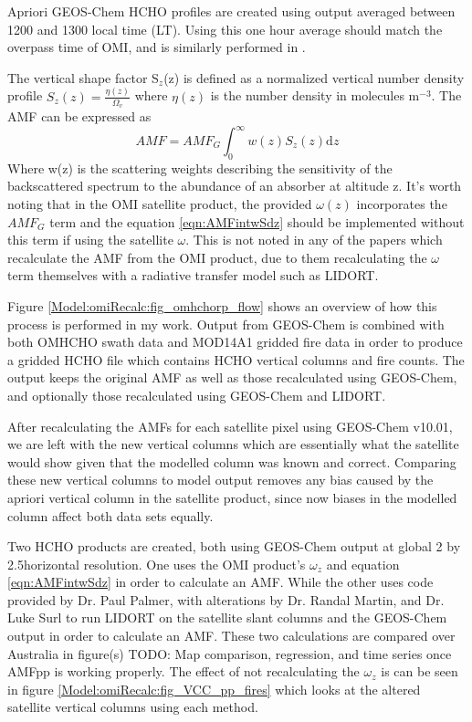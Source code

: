     
  
  
  Apriori GEOS-Chem HCHO profiles are created using output averaged between 1200 and 1300 local time (LT).
  Using this one hour average should match the overpass time of OMI, and is similarly performed in \cite{Jin2017}.
  
  
  The vertical shape factor S$_z$(z) is defined as a normalized vertical number density profile $S_z(z) = \frac{\eta(z)}{\Omega_v}$ where $\eta(z)$ is the number density in molecules m$^{-3}$. 
  The AMF can be expressed as
  \begin{equation} 
    \label{eqn:AMFintwSdz}
    AMF = AMF_G \int_0^\infty w(z) S_z(z) \mathrm{d}z
  \end{equation}
  Where w(z) is the scattering weights describing the sensitivity of the backscattered spectrum to the abundance of an absorber at altitude z.
  It's worth noting that in the OMI satellite product, the provided $\omega(z)$ incorporates the $AMF_G$ term and the equation \ref{eqn:AMFintwSdz} should be implemented without this term if using the satellite $\omega$.
  This is not noted in any of the papers which recalculate the AMF from the OMI product, due to them recalculating the $\omega$ term themselves with a radiative transfer model such as LIDORT.
  
  Figure \ref{Model:omiRecalc:fig_omhchorp_flow} shows an overview of how this process is performed in my work.
  Output from GEOS-Chem is combined with both OMHCHO swath data and MOD14A1 gridded fire data in order to produce a gridded HCHO file which contains HCHO vertical columns and fire counts. 
  The output keeps the original AMF as well as those recalculated using GEOS-Chem, and optionally those recalculated using GEOS-Chem and LIDORT.
  
  
  
  
  After recalculating the AMFs for each satellite pixel using GEOS-Chem v10.01, we are left with the new vertical columns which are essentially what the satellite would show given that the modelled column was known and correct.
  Comparing these new vertical columns to model output removes any bias caused by the apriori vertical column in the satellite product, since now biases in the modelled column affect both data sets equally.
  
  Two HCHO products are created, both using GEOS-Chem output at global 2 by 2.5\degr horizontal resolution.
  One uses the OMI product's $\omega_z$ and equation \ref{eqn:AMFintwSdz} in order to calculate an AMF.
  While the other uses code provided by Dr. Paul Palmer, with alterations by Dr. Randal Martin, and Dr. Luke Surl to run LIDORT on the satellite slant columns and the GEOS-Chem output in order to calculate an AMF.
  These two calculations are compared over Australia in figure(s) TODO: Map comparison, regression, and time series once AMFpp is working properly.
  The effect of not recalculating the $\omega_z$ is can be seen in figure \ref{Model:omiRecalc:fig_VCC_pp_fires} which looks at the altered satellite vertical columns using each method.
  
